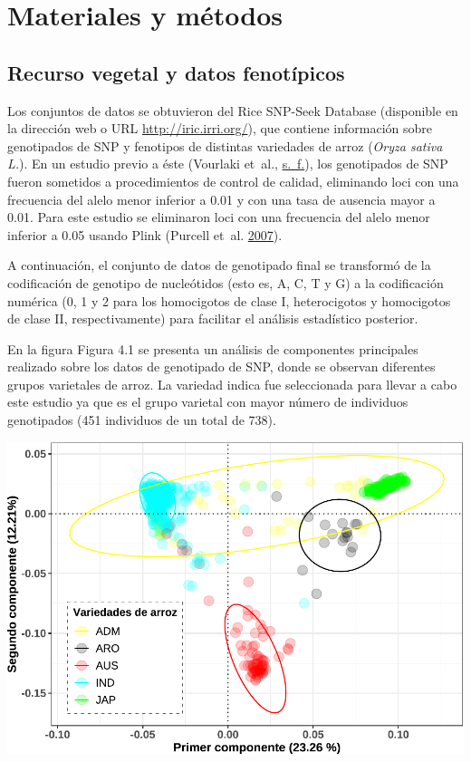 \documentclass[11pt,spanish,a4paper,oneside,]{book} %
\begin{document}
\hypertarget{materiales-y-muxe9todos}{%
\chapter{Materiales y métodos}\label{materiales-y-muxe9todos}}

\hypertarget{recurso-vegetal-y-datos-fenotuxedpicos}{%
\section{Recurso vegetal y datos fenotípicos}\label{recurso-vegetal-y-datos-fenotuxedpicos}}

Los conjuntos de datos se obtuvieron del Rice SNP-Seek Database (disponible en la dirección web o URL \url{http://iric.irri.org/}), que contiene información sobre genotipados de SNP y fenotipos de distintas variedades de arroz (\emph{Oryza sativa L.}). En un estudio previo a éste (Vourlaki et~al., \protect\hyperlink{ref-cite:26}{s.~f.}), los genotipados de SNP fueron sometidos a procedimientos de control de calidad, eliminando loci con una frecuencia del alelo menor inferior a 0.01 y con una tasa de ausencia mayor a 0.01. Para este estudio se eliminaron loci con una frecuencia del alelo menor inferior a 0.05 usando Plink (Purcell et~al. \protect\hyperlink{ref-cite:49}{2007}).

A continuación, el conjunto de datos de genotipado final se transformó de la codificación de genotipo de nucleótidos (esto es, A, C, T y G) a la codificación numérica (0, 1 y 2 para los homocigotos de clase I, heterocigotos y homocigotos de clase II, respectivamente) para facilitar el análisis estadístico posterior.

En la figura Figura 4.1 se presenta un análisis de componentes principales realizado sobre los datos de genotipado de SNP, donde se observan diferentes grupos varietales de arroz. La variedad indica fue seleccionada para llevar a cabo este estudio ya que es el grupo varietal con mayor número de individuos genotipados (451 individuos de un total de 738).

\begin{center}\includegraphics[width=1\linewidth]{figures/Graf_PCA} \end{center}
\end{document}
